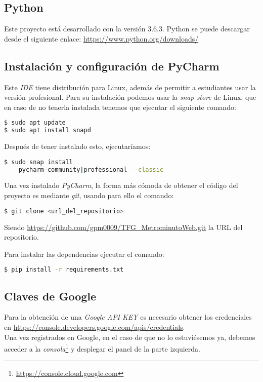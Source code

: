 \subsection{Python}

Este proyecto está desarrollado con la versión 3.6.3. Python se puede descargar desde el siguiente enlace: 
\url{https://www.python.org/downloads/}

\subsection{Instalación y configuración de PyCharm}
Este \textit{IDE} tiene distribución para Linux, además de permitir a estudiantes usar la versión profesional. Para su instalación podemos usar la \textit{snap store} de Linux, que en caso de no tenerla instalada tenemos que ejecutar el siguiente comando:

\renewcommand{\lstlistingname}{Instalar PyCharm}%
\renewcommand{\lstlistlistingname}{List of \lstlistingname s}
\begin{lstlisting}[language=bash,caption={Instalar snapd}]
$ sudo apt update
$ sudo apt install snapd
\end{lstlisting}

Después de tener instalado esto, ejecutaríamos:
\begin{lstlisting}[language=bash,caption={Instalar PyCharm}]
$ sudo snap install 
	pycharm-community|professional --classic
\end{lstlisting}

Una vez instalado \textit{PyCharm}, la forma más cómoda de obtener el código del proyecto es mediante \textit{git}, usando para ello el comando:

\renewcommand{\lstlistingname}{Configurar PyCharm}%
\renewcommand{\lstlistlistingname}{List of \lstlistingname s}
\begin{lstlisting}[language=bash,caption={Descargar el repositorio}]
$ git clone <url_del_repositorio>
\end{lstlisting}
Siendo \url{https://github.com/gpm0009/TFG_MetrominutoWeb.git} la URL del 
repositorio.

Para instalar las dependencias ejecutar el comando:
\begin{lstlisting}[language=bash,caption={Instalar requirements.txt}]
$ pip install -r requirements.txt
\end{lstlisting}

\subsection{Claves de Google}
Para la obtención de una \textit{Google API KEY} es necesario obtener los credenciales en  \url{https://console.developers.google.com/apis/credentials}.\\
Una vez registrados en Google, en el caso de que no lo estuviésemos ya, debemos acceder a la \textit{consola}\footnote{\url{https://console.cloud.google.com}} y desplegar el panel de la parte izquierda.

